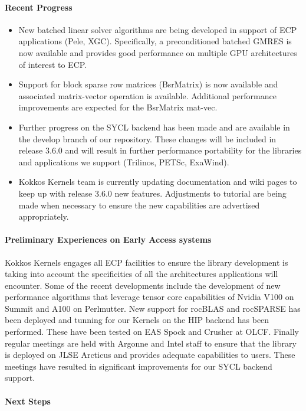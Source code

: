\paragraph{Recent Progress}
\begin{itemize}
\item New batched linear solver algorithms are being developed in support of ECP applications (Pele, XGC).
Specifically, a preconditioned batched GMRES is now available and provides good performance on multiple GPU
architectures of interest to ECP.
\item Support for block sparse row matrices (BsrMatrix) is now available and associated matrix-vector
operation is available. Additional performance improvements are expected for the BsrMatrix mat-vec.
\item Further progress on the SYCL backend has been made and are available in the develop branch of
our repository. These changes will be included in release 3.6.0 and will result in further performance
portability for the libraries and applications we support (Trilinos, PETSc, ExaWind).
\item Kokkos Kernels team is currently updating documentation and wiki pages to keep up with release 3.6.0
new features. Adjustments to tutorial are being made when necessary to ensure the new capabilities are
advertised appropriately.
\end{itemize}

\paragraph{Preliminary Experiences on Early Access systems}
Kokkos Kernels engages all ECP facilities to ensure the library development is taking into account
the specificities of all the architectures applications will encounter. Some of the recent developments
include the development of new performance algorithms that leverage tensor core capabilities of
Nvidia V100 on Summit and A100 on Perlmutter. New support for rocBLAS and rocSPARSE has been deployed
and tunning for our Kernels on the HIP backend has been performed. These have been tested on EAS Spock
and Crusher at OLCF. Finally regular meetings are held with Argonne and Intel staff to ensure that the
library is deployed on JLSE Arcticus and provides adequate capabilities to users. These meetings have
resulted in significant improvements for our SYCL backend support.

\paragraph{Next Steps}

